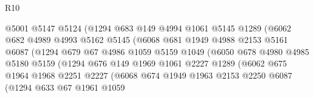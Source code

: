 \begin{lexlean}{R10}
\begin{coremodule}
                            @5001
                            @5147
                            @5124
                            (@1294
                              @683
                              @149
                              @4994
                              @1061
                              @5145
                              @1289
                              (@6062
                                @682
                                @4989
                                @4993
                                @5162
                                @5145
                                (@6068
                                  @681
                                  @1949
                                  @4988
                                  @2153
                                  @5161
                                  @6087
                                  (@1294
                                    @679
                                    @67
                                    @4986
                                    @1059
                                    @5159
                                    @1049
                                    (@6050
                                      @678
                                      @4980
                                      @4985
                                      @5180
                                      @5159
                                      (@1294
                                        @676
                                        @149
                                        @1969
                                        @1061
                                        @2227
                                        @1289
                                        (@6062
                                          @675
                                          @1964
                                          @1968
                                          @2251
                                          @2227
                                          (@6068
                                            @674
                                            @1949
                                            @1963
                                            @2153
                                            @2250
                                            @6087
                                            (@1294
                                              @633
                                              @67
                                              @1961
                                              @1059

\end{coremodule}
\end{lexlean}
